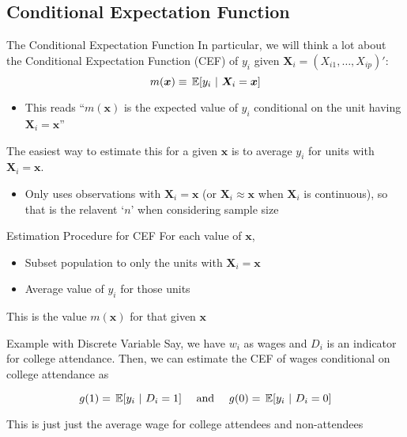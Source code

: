 \documentclass[aspectratio=169,t,11pt,table]{beamer}
\begin{document}
\subsection{Conditional Expectation Function}

\begin{frame}{The Conditional Expectation Function}
  In particular, we will think a lot about the \alert{Conditional Expectation Function} (CEF) of $y_i$ given $\bm{X}_i = (X_{i1}, \dots, X_{ip})'$:
  $$
    m(\bm{x}) \equiv \expec{y_i}{\bm{X}_i = \bm{x}}
  $$
  \begin{itemize}
    \item This reads ``$m(\bm{x})$ is the expected value of $y_i$ conditional on the unit having $\bm{X}_i = \bm{x}$''
  \end{itemize}

  \pause
  \bigskip
  The easiest way to estimate this for a given $\bm{x}$ is to average $y_i$ for units with $\bm{X}_i = \bm{x}$. 
  \pause
  \begin{itemize}
    \item Only uses observations with $\bm{X}_i = \bm{x}$ (or $\bm{X}_i \approx \bm{x}$ when $\bm{X}_i$ is continuous), so that is the relavent `$n$' when considering sample size
  \end{itemize}
\end{frame}

\begin{frame}{Estimation Procedure for CEF}
  For each value of $\bm{x}$, 
  \begin{itemize}
    \item Subset population to only the units with $\bm{X}_i = \bm{x}$
    
    \item Average value of $y_i$ for those units
  \end{itemize}
  
  This is the value $m(\bm{x})$ for that given $\bm{x}$
\end{frame}

\begin{frame}{Example with Discrete Variable}
  Say, we have $w_i$ as wages and $D_i$ is an indicator for college attendance. Then, we can estimate the CEF of wages conditional on college attendance as

  $$
    g(1) = \expec{y_i}{D_i = 1} \quad\text{ and }\quad g(0) = \expec{y_i}{D_i = 0}
  $$

  \bigskip
  This is just just the average wage for college attendees and non-attendees
\end{frame}
\end{document}
